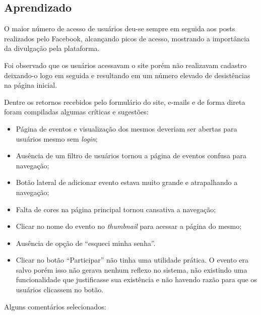 \subsection{Aprendizado}
\par O maior número de acesso de usuários deu-se sempre em seguida aos posts realizados pelo Facebook, alcançando picos de acesso, mostrando a importância da divulgação pela plataforma.
\par Foi observado que os usuários acessavam o site porém não realizavam cadastro deixando-o logo em seguida e resultando em um número elevado de desistências na página inicial.
\par Dentre os retornos recebidos pelo formulário do site, e-mails e de forma direta foram compiladas algumas críticas e sugestões:
\begin{itemize}
\item Página de eventos e visualização dos mesmos deveriam ser abertas para usuários mesmo sem \emph{login};
\item Ausência de um filtro de usuários tornou a página de eventos confusa para navegação;
\item Botão lateral de adicionar evento estava muito grande e atrapalhando a navegação;
\item Falta de cores na página principal tornou cansativa a navegação;
\item Clicar no nome do evento no \emph{thumbnail} para acessar a página do mesmo;
\item Ausência de opção de ``esqueci minha senha''.
\item Clicar no botão ``Participar'' não tinha uma utilidade prática. O evento era salvo porém isso não gerava nenhum reflexo no sistema, não existindo uma funcionalidade que justificasse sua existência e não havendo razão para que os usuários clicassem no botão.
\end{itemize}
\par Alguns comentários selecionados:
